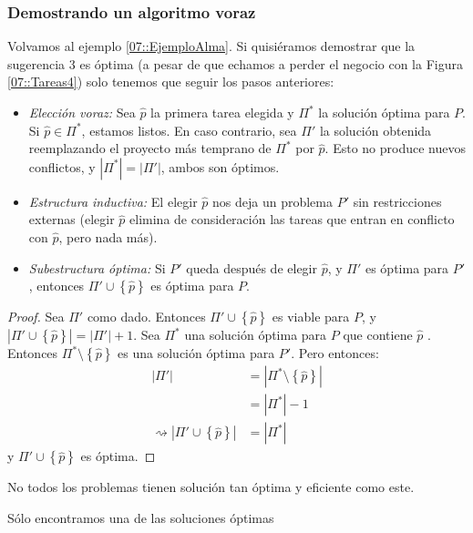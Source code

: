 \documentclass[english, spanish, fleqn, 10pt]{article}
\numberwithin{equation}{section}
\newcommand{\llaves}[1]{\left \{ #1 \right \}}
\newcommand{\nabsoluto}[1]{\left| #1 \right|}
\theoremstyle{definition}
\newenvironment{newquote}{\begin{mdframed}[topline=false,
		rightline=false, bottomline=false, linewidth=.3em,backgroundcolor=black!5, linecolor=black!60]\color{black!70}}{\end{mdframed}}
\begin{document}
\subsubsection{Demostrando un algoritmo voraz}
Volvamos al ejemplo \ref{07::EjemploAlma}. Si quisiéramos demostrar que la sugerencia 3 es óptima (a pesar de que echamos a perder el negocio con la Figura \ref{07::Tareas4}) solo tenemos que seguir los pasos anteriores:
\begin{itemize}
	\item \emph{Elección voraz:} Sea $\hat p$ la primera tarea elegida y $\Pi^*$ la solución óptima para $P$. Si $\hat p \in \Pi^*$, estamos listos. En caso contrario,  sea $\Pi'$ la solución obtenida reemplazando el proyecto más temprano de $\Pi^*$ por $\hat p$. Esto no produce nuevos conflictos, y $\nabsoluto{\Pi^*}=\nabsoluto{\Pi'}$, ambos son óptimos.
	
	\item \emph{Estructura inductiva:}	El elegir $\hat p$ nos deja un problema $P'$ sin restricciones externas (elegir $\hat p$ elimina de consideración las tareas que entran en conflicto con $\hat p$, pero nada más).
	
	\item \emph{Subestructura óptima:} Si $P'$ queda después de elegir $\hat p$, y $\Pi'$ es óptima para $P'$, entonces $\Pi'\cup \llaves{\hat p}$ es óptima para $P$.
\end{itemize}
\begin{proof}
	Sea $\Pi'$ como dado. Entonces $\Pi'\cup\llaves{\hat p}$ es viable para $P$, y $\nabsoluto{\Pi'\cup \llaves{\hat p}}=\nabsoluto{\Pi'}+1$. Sea $\Pi^*$ una solución óptima para $P$ que contiene $\hat p$ . Entonces $\Pi^*\setminus\llaves{\hat p}$ es una solución óptima para $P'$. Pero entonces:
	\begin{align*}
	\nabsoluto{\Pi'}&=\nabsoluto{\Pi^* \setminus \llaves{\hat p}}\\
	&=\nabsoluto{\Pi^* }-1\\
	\rightsquigarrow \nabsoluto{\Pi'\cup \llaves{\hat p}}&=\nabsoluto{\Pi^* }
	\end{align*}
	y $\Pi' \cup \llaves{\hat p}$ es óptima.
\end{proof}

\begin{newquote}
No todos los problemas tienen solución tan óptima y eficiente como este.
\end{newquote}
\begin{newquote}
Sólo encontramos una de las soluciones óptimas
\end{newquote}
\end{document}
